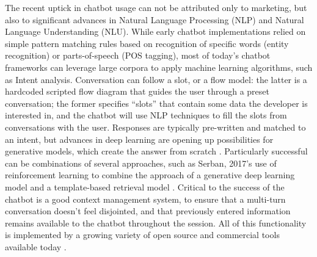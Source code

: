 The recent uptick in chatbot usage can not be attributed only to marketing, but also to significant advances in Natural Language Processing (NLP) and Natural Language Understanding (NLU). 
While early chatbot implementations relied on simple pattern matching rules based on recognition of specific words (entity recognition) or parts-of-speech (POS tagging), most of today's chatbot frameworks can leverage large corpora to apply machine learning algorithms, such as Intent analysis. Conversation can follow a slot, or a flow model: the latter is a hardcoded scripted flow diagram that guides the user through a preset conversation; the former specifies ``slots'' that contain some data the developer is interested in, and the chatbot will use NLP techniques to fill the slots from conversations with the user. Responses are typically pre-written and matched to an intent, but advances in deep learning are opening up possibilities for generative models, which create the answer from scratch \cite{Gregori}. Particularly successful can be combinations of several approaches, such as Serban, 2017's use of reinforcement learning to combine the approach of a generative deep learning model and a template-based retrieval model \cite{Serban2017}. Critical to the success of the chatbot is a good context management system, to ensure that a multi-turn conversation doesn't feel disjointed, and that previously entered information remains available to the chatbot throughout the session. All of this functionality is implemented by a growing variety of open source and commercial tools available today \cite{JavierCouto}.\\
